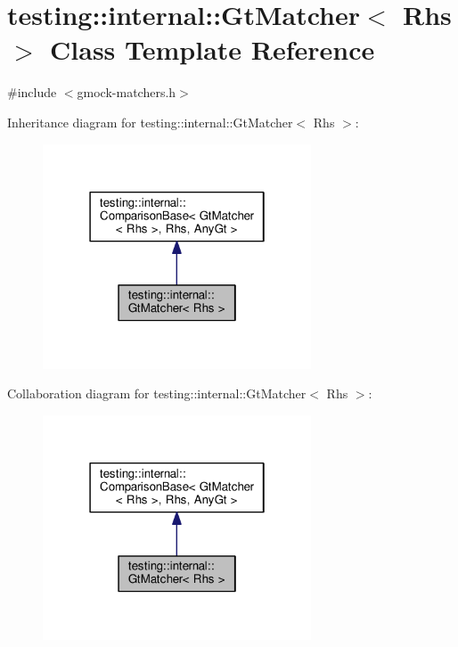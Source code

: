 \hypertarget{classtesting_1_1internal_1_1GtMatcher}{}\section{testing\+:\+:internal\+:\+:Gt\+Matcher$<$ Rhs $>$ Class Template Reference}
\label{classtesting_1_1internal_1_1GtMatcher}


{\ttfamily \#include $<$gmock-\/matchers.\+h$>$}



Inheritance diagram for testing\+:\+:internal\+:\+:Gt\+Matcher$<$ Rhs $>$\+:\nopagebreak
\begin{figure}[H]
\begin{center}
\leavevmode
\includegraphics[width=226pt]{classtesting_1_1internal_1_1GtMatcher__inherit__graph}
\end{center}
\end{figure}


Collaboration diagram for testing\+:\+:internal\+:\+:Gt\+Matcher$<$ Rhs $>$\+:\nopagebreak
\begin{figure}[H]
\begin{center}
\leavevmode
\includegraphics[width=226pt]{classtesting_1_1internal_1_1GtMatcher__coll__graph}
\end{center}
\end{figure}
